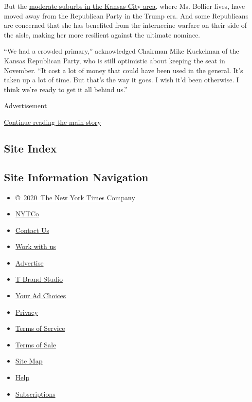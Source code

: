 But the
\href{https://www.nytimes.com/2020/05/30/us/politics/kansas-senate-kobach.html}{moderate
suburbs in the Kansas City area}, where Ms. Bollier lives, have moved
away from the Republican Party in the Trump era. And some Republicans
are concerned that she has benefited from the internecine warfare on
their side of the aisle, making her more resilient against the ultimate
nominee.

``We had a crowded primary,'' acknowledged Chairman Mike Kuckelman of
the Kansas Republican Party, who is still optimistic about keeping the
seat in November. ``It cost a lot of money that could have been used in
the general. It's taken up a lot of time. But that's the way it goes. I
wish it'd been otherwise. I think we're ready to get it all behind us.''

Advertisement

\protect\hyperlink{after-bottom}{Continue reading the main story}

\hypertarget{site-index}{%
\subsection{Site Index}\label{site-index}}

\hypertarget{site-information-navigation}{%
\subsection{Site Information
Navigation}\label{site-information-navigation}}

\begin{itemize}
\tightlist
\item
  \href{https://help.nytimes.com/hc/en-us/articles/115014792127-Copyright-notice}{©~2020~The
  New York Times Company}
\end{itemize}

\begin{itemize}
\tightlist
\item
  \href{https://www.nytco.com/}{NYTCo}
\item
  \href{https://help.nytimes.com/hc/en-us/articles/115015385887-Contact-Us}{Contact
  Us}
\item
  \href{https://www.nytco.com/careers/}{Work with us}
\item
  \href{https://nytmediakit.com/}{Advertise}
\item
  \href{http://www.tbrandstudio.com/}{T Brand Studio}
\item
  \href{https://www.nytimes.com/privacy/cookie-policy\#how-do-i-manage-trackers}{Your
  Ad Choices}
\item
  \href{https://www.nytimes.com/privacy}{Privacy}
\item
  \href{https://help.nytimes.com/hc/en-us/articles/115014893428-Terms-of-service}{Terms
  of Service}
\item
  \href{https://help.nytimes.com/hc/en-us/articles/115014893968-Terms-of-sale}{Terms
  of Sale}
\item
  \href{https://spiderbites.nytimes.com}{Site Map}
\item
  \href{https://help.nytimes.com/hc/en-us}{Help}
\item
  \href{https://www.nytimes.com/subscription?campaignId=37WXW}{Subscriptions}
\end{itemize}
